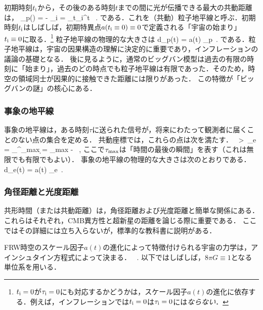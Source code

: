 初期時刻$t_{\rm i}$から，その後のある時刻$t$までの間に光が伝播できる最大の共動距離は，
\beq
\chi_p(\tau) = \tau - \tau_{\rm i} = \int_{t_{\rm i}}^t \, .
\eeq
である．これを（共動）粒子地平線と呼ぶ．初期時刻$t_{\rm i}$はしばしば，初期特異点$a(t_{\rm i} \equiv 0) \equiv 0$で定義される「宇宙の始まり」$t_{\rm i} \equiv 0$に取る．\footnote{$t_{\rm i} = 0$が$\tau_{\rm i} = 0$にも対応するかどうかは，スケール因子$a(t)$の進化に依存する．例えば，インフレーションでは$t_{\rm i}=0$は$\tau_{\rm i}=0$には{\it ならない}．}
粒子地平線の物理的な大きさは
\beq
d_p(t) = a(t) \chi_p\, .
\eeq
である．粒子地平線は，宇宙の因果構造の理解に決定的に重要であり，インフレーションの議論の基礎となる．
後に見るように，通常のビッグバン模型は過去の有限の時刻に「始まり」，過去のどの時点でも粒子地平線は有限であった．そのため，時空の領域同士が因果的に接触できた距離には限りがあった．
この特徴が「ビッグバンの謎」の核心にある．

\subsubsection*{事象の地平線}

事象の地平線は，ある時刻$\tau$に送られた信号が，将来にわたって観測者に届くことのない点の集合を定める．
共動座標では，これらの点は次を満たす．
\beq
\chi \ >\  \chi_e = \int_\tau^{\tau_{\rm max}} \d \tau = \tau_{\rm max} - \tau\, ,
\eeq
ここで$\tau_{\rm max}$は「時間の最後の瞬間」を表す（これは無限でも有限でもよい）．
事象の地平線の物理的な大きさは次のとおりである．
\beq
d_e(t) = a(t) \chi_e\, .
\eeq

\subsubsection*{角径距離と光度距離}

共形時間（または共動距離）は，角径距離および光度距離と簡単な関係にある．これらはそれぞれ，CMB異方性と超新星の距離を論じる際に重要である．
ここではその詳細には立ち入らないが，標準的な教科書\cite{Dodelson, Mukhanov, WeinbergCosmology}に説明がある．



\label{sec:EinsteinEqns}

FRW時空のスケール因子$a(t)$の進化によって特徴付けられる宇宙の力学は，アインシュタイン方程式によって決まる．
\beq
\label{equ:Einstein}
\, .
\eeq
以下ではしばしば，$8\pi G \equiv 1$となる単位系を用いる．

